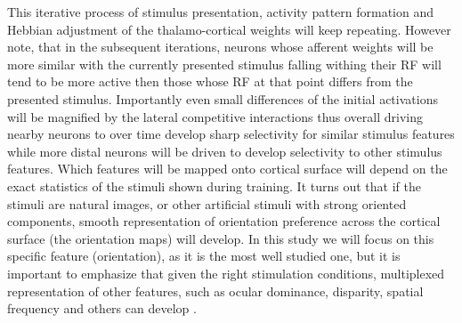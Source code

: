 \documentclass[utf8]{frontiersSCNS}
\begin{document}
This iterative process of stimulus presentation, activity pattern formation and Hebbian adjustment of the thalamo-cortical weights will keep repeating. However note, that in the subsequent iterations, neurons whose afferent weights will be more similar with the currently presented stimulus falling withing their RF will tend to be more active then those whose RF at that point differs from the presented stimulus. Importantly even small differences of the initial activations will be magnified by the lateral competitive interactions thus overall driving nearby neurons to over time develop sharp selectivity for similar stimulus features while more distal neurons will be driven to develop selectivity to other stimulus features. Which features will be mapped onto
cortical surface will depend on the exact statistics of the stimuli shown during training. It turns out that if the stimuli are natural images, or 
other artificial stimuli with strong oriented components, smooth representation of orientation preference across the cortical surface (the orientation
maps) will develop. In this study we will focus on this specific feature (orientation), as it is the most well studied one, but it is important to
emphasize that given the right stimulation conditions, multiplexed representation of other features, such as ocular dominance, disparity, spatial frequency and others can develop \citep{CMVC}.
\end{document}
